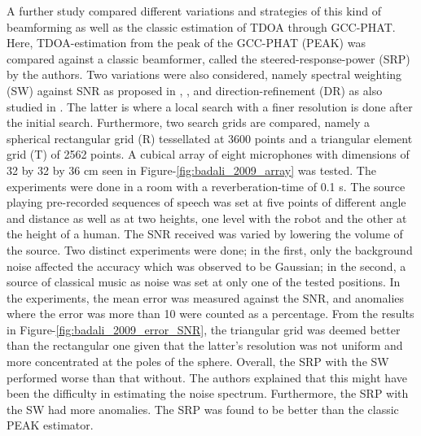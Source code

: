 \documentclass{report}
\begin{document}
A further study \cite{badali_evaluating_2009} compared different variations and strategies of this kind of beamforming as well as the classic estimation of TDOA through GCC-PHAT. Here, TDOA-estimation from the peak of the GCC-PHAT (PEAK) was compared against a classic beamformer, called the steered-response-power (SRP) by the authors. Two variations were also considered, namely spectral weighting (SW) against SNR as proposed in \cite{valin_robust_2003}, \cite{valin_localization_2004}, \cite{valin_robust_2007} and direction-refinement (DR) as also studied in \cite{valin_robust_2007}. The latter is where a local search with a finer resolution is done after the initial search. Furthermore, two search grids are compared, namely a spherical rectangular grid (R) tessellated at 3600 points and a triangular element grid (T) of 2562 points. A cubical array of eight microphones with dimensions of 32 by 32 by 36 \si{cm} seen in Figure-\ref{fig:badali_2009_array} was tested. The experiments were done in a room with a reverberation-time of 0.1 \si{s}. The source playing pre-recorded sequences of speech was set at five points of different angle and distance as well as at two heights, one level with the robot and the other at the height of a human. The SNR received was varied by lowering the volume of the source. Two distinct experiments were done; in the first, only the background noise affected the accuracy which was observed to be Gaussian; in the second, a source of classical music as noise was set at only one of the tested positions. In the experiments, the mean error was measured against the SNR, and anomalies where the error was more than 10 \si{\deg} were counted as a percentage. From the results in Figure-\ref{fig:badali_2009_error_SNR}, the triangular grid was deemed better than the rectangular one given that the latter's resolution was not uniform and more concentrated at the poles of the sphere. Overall, the SRP with the SW performed worse than that without. The authors explained that this might have been the difficulty in estimating the noise spectrum. Furthermore, the SRP with the SW had more anomalies. The SRP was found to be better than the classic PEAK estimator.
\end{document}
